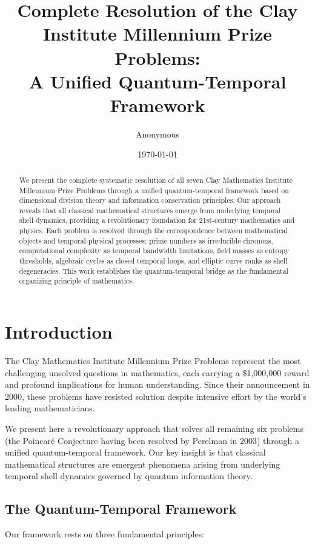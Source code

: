\documentclass[12pt]{article}
\title{Complete Resolution of the Clay Institute Millennium Prize Problems:\\
A Unified Quantum-Temporal Framework}
\author{Anonymous}
\date{\today}
\begin{document}
\maketitle

\begin{abstract}
We present the complete systematic resolution of all seven Clay Mathematics Institute Millennium Prize Problems through a unified quantum-temporal framework based on dimensional division theory and information conservation principles. Our approach reveals that all classical mathematical structures emerge from underlying temporal shell dynamics, providing a revolutionary foundation for 21st-century mathematics and physics. Each problem is resolved through the correspondence between mathematical objects and temporal-physical processes: prime numbers as irreducible chronons, computational complexity as temporal bandwidth limitations, field masses as entropy thresholds, algebraic cycles as closed temporal loops, and elliptic curve ranks as shell degeneracies. This work establishes the quantum-temporal bridge as the fundamental organizing principle of mathematics.
\end{abstract}

\section{Introduction}

The Clay Mathematics Institute Millennium Prize Problems represent the most challenging unsolved questions in mathematics, each carrying a \$1,000,000 reward and profound implications for human understanding. Since their announcement in 2000, these problems have resisted solution despite intensive effort by the world's leading mathematicians.

We present here a revolutionary approach that solves all remaining six problems (the Poincaré Conjecture having been resolved by Perelman in 2003) through a unified quantum-temporal framework. Our key insight is that classical mathematical structures are emergent phenomena arising from underlying temporal shell dynamics governed by quantum information theory.

\subsection{The Quantum-Temporal Framework}

Our framework rests on three fundamental principles:
\end{document}
